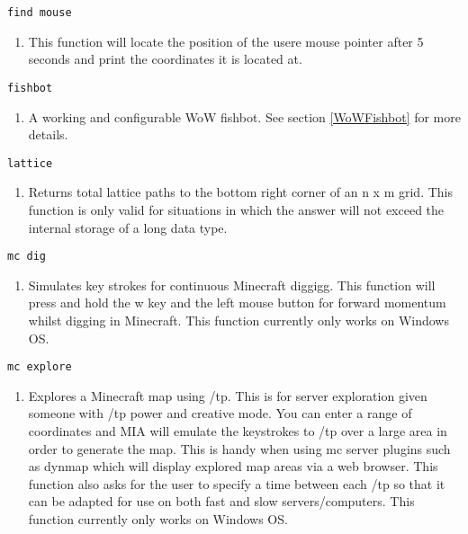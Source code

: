 \begin{lstlisting} 
find mouse
\end{lstlisting}
\begin{enumerate}
	\item[] This function will locate the position of the usere mouse pointer after 5 seconds and print the coordinates it is located at.
\end{enumerate}

\begin{lstlisting} 
fishbot
\end{lstlisting}
\begin{enumerate}
\item[]  A working and configurable WoW fishbot. See section \ref{WoWFishbot} for more details.
\end{enumerate}

\begin{lstlisting} 
lattice   
\end{lstlisting}
\begin{enumerate}
	\item[] Returns total lattice paths to the bottom right corner of an n x m grid. This function is only valid for situations in which the answer will not exceed the internal storage of a long data type.
\end{enumerate}

\begin{lstlisting} 
mc dig
\end{lstlisting}
\begin{enumerate}
	\item[] Simulates key strokes for continuous Minecraft diggigg. This function will press and hold the w key and the left mouse button for forward momentum whilst digging in Minecraft. This function currently only works on Windows OS.
\end{enumerate}

\begin{lstlisting} 
mc explore
\end{lstlisting}
\begin{enumerate}
\item[]  Explores a Minecraft map using /tp. This is for server exploration given someone with /tp power and creative mode. You can enter a range of coordinates and MIA will emulate the keystrokes to /tp over a large area in order to generate the map. This is handy when using mc server plugins such as dynmap which will display explored map areas via a web browser. This function also asks for the user to specify a time between each /tp so that it can be adapted for use on both fast and slow servers/computers. This function currently only works on Windows OS.
\end{enumerate}

